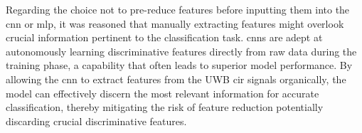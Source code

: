 Regarding the choice not to pre-reduce features before inputting them into the \gls{cnn} or \gls{mlp}, it was reasoned that manually extracting features might overlook crucial information pertinent to the classification task. \acrshort{cnn}s are adept at autonomously learning discriminative features directly from raw data during the training phase, a capability that often leads to superior model performance. By allowing the \acrshort{cnn} to extract features from the UWB \acrshort{cir} signals organically, the model can effectively discern the most relevant information for accurate classification, thereby mitigating the risk of feature reduction potentially discarding crucial discriminative features.

